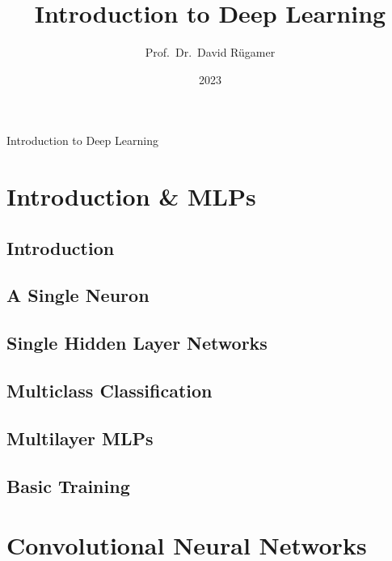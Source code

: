 \documentclass[13pt,compress]{beamer}
\title{Introduction to Deep Learning}
\author{Prof.~Dr.~David R\"ugamer}
\institute{LMU Munich, MCML}
\date{2023}
\begin{document}



\begin{frame}[plain]
  \titlepage
\end{frame}
\begin{frame}[plain]{Introduction to Deep Learning}
\tableofcontents[sectionstyle=show/show, subsectionstyle=hide/hide]
\end{frame}
\section{Introduction \& MLPs}
\subsection{Introduction}

\subsection {A Single Neuron}

\subsection{Single Hidden Layer Networks}

\subsection{Multiclass Classification}

\subsection{Multilayer MLPs}

\subsection{Basic Training}

\section{Convolutional Neural Networks}
\end{document}
